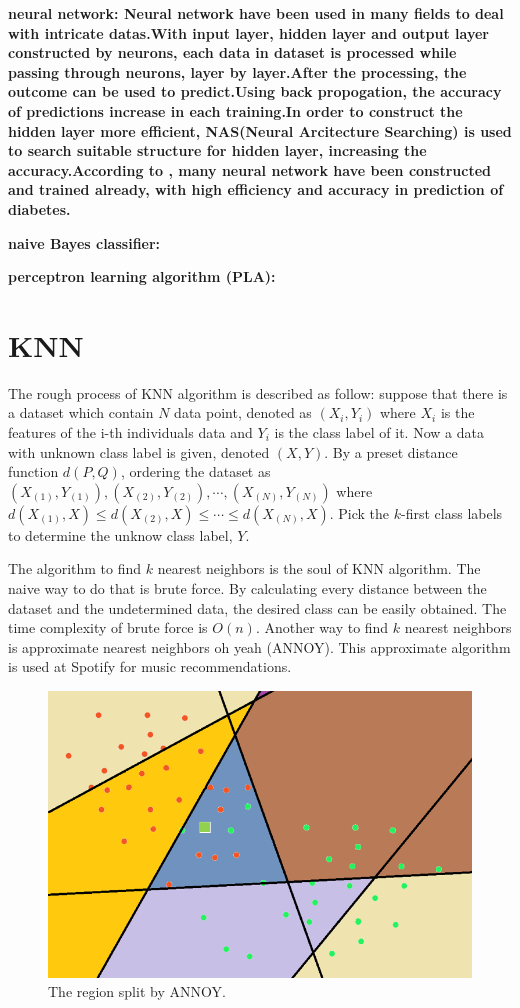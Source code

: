 \documentclass[twocolumn,10pt]{article}
\begin{document}
  \bf{neural network}: \rm{Neural} network have been used in many fields to deal with intricate datas.With input layer, hidden layer and output layer constructed by neurons, each data in dataset is processed while passing through neurons, layer by layer.After the processing, the outcome can be used to predict.Using back propogation, the accuracy of predictions increase in each training.In order to construct the hidden layer more efficient, NAS(Neural Arcitecture Searching) is used to search suitable structure for hidden layer, increasing the accuracy.According to \cite{Gadekallu2020}\cite{Beghriche2021}, many neural network have been constructed and trained already, with high efficiency and accuracy in prediction of diabetes.

  \bf{naive Bayes classifier}: 

  \bf{perceptron learning algorithm (PLA)}: 

\section{KNN}
  \rm{The} rough process of KNN algorithm is described as follow: suppose that there is a dataset which contain $N$ data point, denoted as 
  $(X_i,Y_i)$ where $X_i$ is the features of the i-th individuals data and $Y_i$ is the class label of it. Now 
  a data with unknown class label is given, denoted $(X, Y)$. By a preset distance function $d(P, Q)$, ordering the dataset 
  as $(X_{(1)}, Y_{(1)}), (X_{(2)}, Y_{(2)}), \cdots, (X_{(N)}, Y_{(N)})$ where $d(X_{(1)}, X)\leq d(X_{(2)}, X)\leq\cdots\leq d(X_{(N)}, X)$. 
  Pick the $k$-first class labels to determine the unknow class label, $Y$.

  The algorithm to find $k$ nearest neighbors is the soul of KNN algorithm. The naive way to do that is brute force. By calculating every 
  distance between the dataset and the undetermined data, the desired class can be easily obtained. The time complexity of brute force is $O(n)$. 
  Another way to find $k$ nearest neighbors is approximate nearest neighbors oh yeah (ANNOY). This approximate algorithm is used at Spotify 
  for music recommendations. 
  \begin{figure}[htb]
    \centering
    \includegraphics[scale=0.5]{assets/ANNOY-split.png}
    \caption{The region split by ANNOY.}
    \label{fig:ANNOY_split}
  \end{figure}
\end{document}

